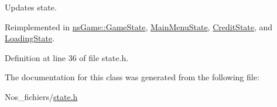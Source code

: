 Updates state. 



Reimplemented in \hyperlink{classns_game_1_1_game_state_a4d3cb871a1aec541a37fe241664b738c}{ns\+Game\+::\+Game\+State}, \hyperlink{class_main_menu_state_a7846cc7f1bd9b1fc40d77cc8f7644e03}{Main\+Menu\+State}, \hyperlink{class_credit_state_a52a92d650fce22fa08b37359c3a5aa64}{Credit\+State}, and \hyperlink{class_loading_state_a2c84aeaac65724696a6cacd6474119bf}{Loading\+State}.



Definition at line 36 of file state.\+h.



The documentation for this class was generated from the following file\+:\begin{DoxyCompactItemize}
\item 
Nos\+\_\+fichiers/\hyperlink{state_8h}{state.\+h}\end{DoxyCompactItemize}
